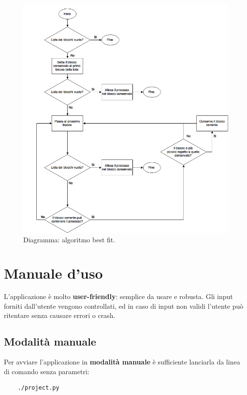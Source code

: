 \documentclass[12pt]{report}
\renewcommand\emph{\textbf}
\begin{document}
            \begin{figure}[H]
                \caption{Diagramma: algoritmo best fit.}
                \centering
                \includegraphics[width=1\textwidth]{dia1}
            \end{figure}


    \section{Manuale d'uso}

        L'applicazione è molto \emph{user-friendly}: semplice da usare e robusta. Gli input forniti dall'utente vengono controllati, ed in caso di input non validi l'utente può ritentare senza causare errori o crash.

        \subsection{Modalità manuale}

            Per avviare l'applicazione in \emph{modalità manuale} è sufficiente lanciarla da linea di comando senza parametri:

            \begin{verbatim}
    ./project.py
            \end{verbatim}
\end{document}
